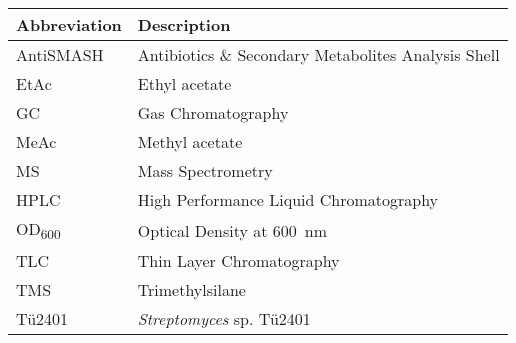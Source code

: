 
\begin{table}[htbp]
	\centering
	\begin{tabularx}{\textwidth}{>{\hsize=0.25\hsize}X>{\hsize=0.75\hsize}X}
		\toprule
		\textbf{Abbreviation}		& \textbf{Description}			\\
		\midrule
		AntiSMASH	& Antibiotics \& Secondary Metabolites Analysis Shell	\\
		EtAc		& Ethyl acetate			\\
		GC			& Gas Chromatography	\\
		MeAc		& Methyl acetate		\\
		MS			& Mass Spectrometry		\\
		HPLC		& High Performance Liquid Chromatography		\\
		OD\textsubscript{600}	& Optical Density at \SI{600}{\nano\meter}	\\
		TLC			& Thin Layer Chromatography 	\\
		TMS 		& Trimethylsilane		\\
		Tü2401		& \textit{Streptomyces} sp. Tü2401		\\
		
		
		\bottomrule
	\end{tabularx}
\end{table}
